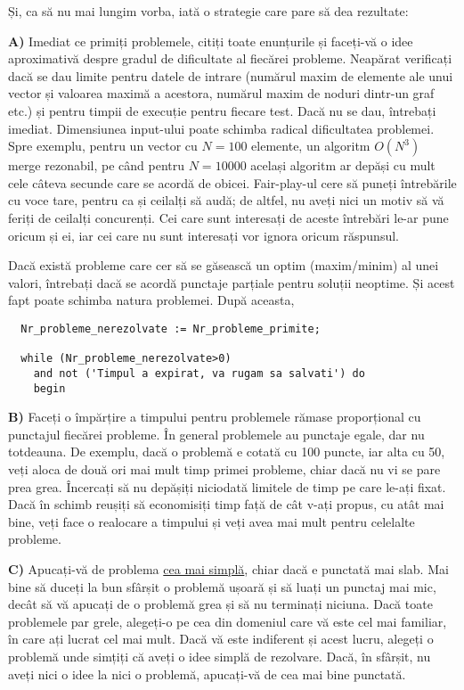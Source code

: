 Și, ca să nu mai lungim vorba, iată o strategie care pare să dea rezultate:

{\bf A)} Imediat ce primiți problemele, citiți toate enunțurile și faceți-vă o
idee aproximativă despre gradul de dificultate al fiecărei probleme. Neapărat
verificați dacă se dau limite pentru datele de intrare (numărul maxim de
elemente ale unui vector și valoarea maximă a acestora, numărul maxim de
noduri dintr-un graf etc.) și pentru timpii de execuție pentru fiecare
test. Dacă nu se dau, întrebați imediat. Dimensiunea input-ului poate schimba
radical dificultatea problemei. Spre exemplu, pentru un vector cu $N=100$
elemente, un algoritm $O(N^{3})$ merge rezonabil, pe când pentru $N=10000$
același algoritm ar depăși cu mult cele câteva secunde care se acordă de
obicei. Fair-play-ul cere să puneți întrebările cu voce tare, pentru ca și
ceilalți să audă; de altfel, nu aveți nici un motiv să vă feriți de ceilalți
concurenți. Cei care sunt interesați de aceste întrebări le-ar pune oricum și
ei, iar cei care nu sunt interesați vor ignora oricum răspunsul.

Dacă există probleme care cer să se găsească un optim (maxim/minim) al unei
valori, întrebați dacă se acordă punctaje parțiale pentru soluții neoptime. Și
acest fapt poate schimba natura problemei. După aceasta,

\begin{verbatim}
  Nr_probleme_nerezolvate := Nr_probleme_primite;

  while (Nr_probleme_nerezolvate>0) 
    and not ('Timpul a expirat, va rugam sa salvati') do
    begin
\end{verbatim}

{\bf B)} Faceți o împărțire a timpului pentru problemele rămase proporțional
cu punctajul fiecărei probleme. În general problemele au punctaje egale, dar
nu totdeauna. De exemplu, dacă o problemă e cotată cu 100 puncte, iar alta cu
50, veți aloca de două ori mai mult timp primei probleme, chiar dacă nu vi se
pare prea grea. Încercați să nu depășiți niciodată limitele de timp pe care
le-ați fixat. Dacă în schimb reușiți să economisiți timp față de cât v-ați
propus, cu atât mai bine, veți face o realocare a timpului și veți avea mai
mult pentru celelalte probleme.

{\bf C)} Apucați-vă de problema \underline{cea mai simplă}, chiar dacă e
punctată mai slab. Mai bine să duceți la bun sfârșit o problemă ușoară și să
luați un punctaj mai mic, decât să vă apucați de o problemă grea și să nu
terminați niciuna. Dacă toate problemele par grele, alegeți-o pe cea din
domeniul care vă este cel mai familiar, în care ați lucrat cel mai mult. Dacă
vă este indiferent și acest lucru, alegeți o problemă unde simțiți că aveți o
idee simplă de rezolvare. Dacă, în sfârșit, nu aveți nici o idee la nici o
problemă, apucați-vă de cea mai bine punctată.

